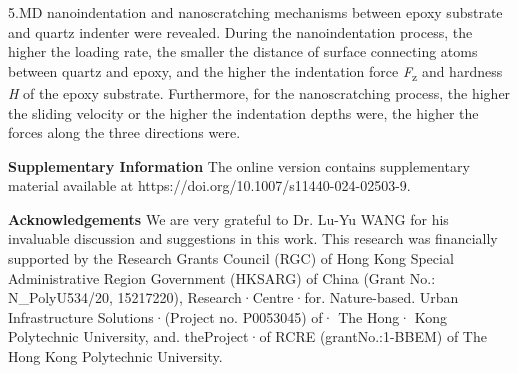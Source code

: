 \documentclass{article}
\begin{document}
\begin{hangpars}
5.\quad MD nanoindentation and nanoscratching mechanisms between epoxy substrate and quartz indenter were revealed. During the nanoindentation process, the higher the loading rate, the smaller the distance of surface connecting atoms between quartz and epoxy, and the higher the indentation force \emph{F}\textsubscript{z} and hardness \emph{H} of the epoxy substrate. Furthermore, for the nanoscratching process, the higher the sliding velocity or the higher the indentation depths were, the higher the forces along the three directions were.
\end{hangpars}

\noindent\textbf{Supplementary Information} The online version contains supplementary material available at https://doi.org/10.1007/s11440-024-02503-9.

\noindent\textbf{Acknowledgements} We are very grateful to Dr. Lu-Yu WANG for his invaluable discussion and suggestions in this work. This research was financially supported by the Research Grants Council (RGC) of Hong Kong Special Administrative Region Government (HKSARG) of China (Grant No.: N\_PolyU534/20, 15217220), Research·Centre·for. Nature-based. Urban Infrastructure Solutions·(Project no. P0053045) of· The Hong· Kong Polytechnic University, and. theProject·of RCRE (grantNo.:1-BBEM) of The Hong Kong Polytechnic University.
\end{document}
